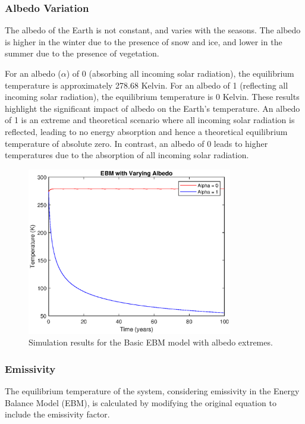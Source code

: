 \documentclass[12pt]{article}
\begin{document}
\subsubsection{Albedo Variation}
The albedo of the Earth is not constant, 
and varies with the seasons. 
The albedo is higher in the winter due to the presence of snow and ice, 
and lower in the summer due to the presence of vegetation. 

For an albedo ($\alpha$) of 0 (absorbing all incoming solar radiation), 
the equilibrium temperature is approximately 278.68 Kelvin.
For an albedo of 1 (reflecting all incoming solar radiation), 
the equilibrium temperature is 0 Kelvin.
These results highlight the significant impact of albedo on the Earth's temperature. 
An albedo of 1 is an extreme and theoretical scenario 
where all incoming solar radiation is reflected, 
leading to no energy absorption 
and hence a theoretical equilibrium temperature of absolute zero. 
In contrast, an albedo of 0 leads to higher temperatures 
due to the absorption of all incoming solar radiation. 

\begin{figure}[ht]
\centering
\includegraphics[width=0.8\textwidth]{albedo_extremes.eps}
\caption{Simulation results for the Basic EBM model with albedo extremes.}
\label{fig:albedoExtremes}
\end{figure}

\subsubsection{Emissivity}
The equilibrium temperature of the system, 
considering emissivity in the Energy Balance Model (EBM), 
is calculated by modifying the original equation 
to include the emissivity factor. 
\end{document}
